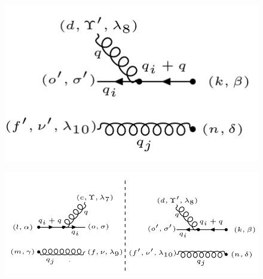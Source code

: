 \begin{figure}[ht!]
\centering
\includegraphics[scale=0.7]{images/QGG/qggM1dagger.png}
\end{figure}
\begin{figure}[ht!]
\centering
\includegraphics[scale=0.7]{images/QGG/qggM1Squer.png}
\end{figure}
